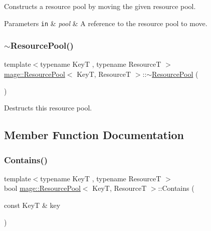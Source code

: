 Constructs a resource pool by moving the given resource pool.


\begin{DoxyParams}[1]{Parameters}
\mbox{\tt in}  & {\em pool} & A reference to the resource pool to move. \\
\hline
\end{DoxyParams}
\hypertarget{classmage_1_1_resource_pool_ad5dceb2a1cbd47ced5cb6ad269f4510e}{}\label{classmage_1_1_resource_pool_ad5dceb2a1cbd47ced5cb6ad269f4510e} 
\subsubsection{\texorpdfstring{$\sim$\+Resource\+Pool()}{~ResourcePool()}}
{\footnotesize\ttfamily template$<$typename KeyT , typename ResourceT $>$ \\
\hyperlink{classmage_1_1_resource_pool}{mage\+::\+Resource\+Pool}$<$ KeyT, ResourceT $>$\+::$\sim$\hyperlink{classmage_1_1_resource_pool}{Resource\+Pool} (\begin{DoxyParamCaption}{ }\end{DoxyParamCaption})\hspace{0.3cm}{\ttfamily [noexcept]}}

Destructs this resource pool. 

\subsection{Member Function Documentation}
\hypertarget{classmage_1_1_resource_pool_a36665c107134816d3e72322e9c80bebd}{}\label{classmage_1_1_resource_pool_a36665c107134816d3e72322e9c80bebd} 
\subsubsection{\texorpdfstring{Contains()}{Contains()}}
{\footnotesize\ttfamily template$<$typename KeyT , typename ResourceT $>$ \\
bool \hyperlink{classmage_1_1_resource_pool}{mage\+::\+Resource\+Pool}$<$ KeyT, ResourceT $>$\+::Contains (\begin{DoxyParamCaption}\item[{const KeyT \&}]{key }\end{DoxyParamCaption})\hspace{0.3cm}{\ttfamily [noexcept]}}

